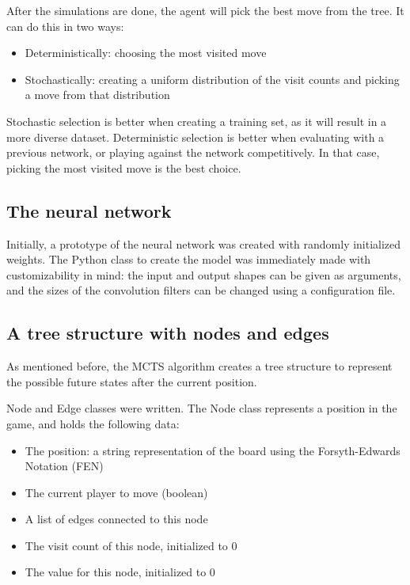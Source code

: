 \documentclass{article}
\begin{document}
After the simulations are done, the agent will pick the best move from the tree. 
It can do this in two ways:

\begin{itemize}
    \item Deterministically: choosing the most visited move 
    \item Stochastically: creating a uniform distribution of the visit counts and picking a move from that distribution
\end{itemize}

Stochastic selection is better when creating a training set, as it will result in a more diverse dataset.
Deterministic selection is better when evaluating with a previous network, or playing against the network competitively. 
In that case, picking the most visited move is the best choice.


\subsection{The neural network}

Initially, a prototype of the neural network was created with randomly initialized weights.
The Python class to create the model was immediately made with customizability in mind: 
the input and output shapes can be given as arguments, and the sizes of the convolution filters 
can be changed using a configuration file.

\subsection{A tree structure with nodes and edges}

As mentioned before, the MCTS algorithm creates a tree structure to represent 
the possible future states after the current position.

Node and Edge classes were written. The Node class represents a position in the game, and
holds the following data:

\begin{itemize}
    \item The position: a string representation of the board using the Forsyth-Edwards Notation (FEN) \cite{ForsythEdwardsNotation2022}
    \item The current player to move (boolean)
    \item A list of edges connected to this node
    \item The visit count of this node, initialized to 0
    \item The value for this node, initialized to 0
\end{itemize}
\end{document}
